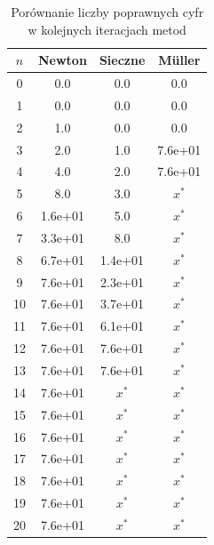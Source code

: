 \documentclass[12pt]{article}
\begin{document}
\begin{table}[H]
\centering
\begin{tabular}{|c|c|c|c|}
    \hline
    $n$ & Newton & Sieczne & Müller  \\ \hline\hline
    0  & 0.0     & 0.0     & 0.0     \\ \hline
    1  & 0.0     & 0.0     & 0.0     \\ \hline
    2  & 1.0     & 0.0     & 0.0     \\ \hline
    3  & 2.0     & 1.0     & 7.6e+01 \\ \hline
    4  & 4.0     & 2.0     & 7.6e+01 \\ \hline
    5  & 8.0     & 3.0     & $x^*$\\ \hline
    6  & 1.6e+01 & 5.0     & $x^*$\\ \hline
    7  & 3.3e+01 & 8.0     & $x^*$\\ \hline
    8  & 6.7e+01 & 1.4e+01 & $x^*$\\ \hline
    9  & 7.6e+01 & 2.3e+01 & $x^*$\\ \hline
    10 & 7.6e+01 & 3.7e+01 & $x^*$\\ \hline
    11 & 7.6e+01 & 6.1e+01 & $x^*$\\ \hline
    12 & 7.6e+01 & 7.6e+01 & $x^*$\\ \hline
    13 & 7.6e+01 & 7.6e+01 & $x^*$\\ \hline
    14 & 7.6e+01 & $x^*$   & $x^*$\\ \hline
    15 & 7.6e+01 & $x^*$   & $x^*$\\ \hline
    16 & 7.6e+01 & $x^*$   & $x^*$\\ \hline
    17 & 7.6e+01 & $x^*$   & $x^*$\\ \hline
    18 & 7.6e+01 & $x^*$   & $x^*$\\ \hline
    19 & 7.6e+01 & $x^*$   & $x^*$\\ \hline
    20 & 7.6e+01 & $x^*$   & $x^*$\\ \hline
\end{tabular}
\caption{Porównanie liczby poprawnych cyfr w kolejnych iteracjach metod}
\label{table:table1}
\end{table}
\end{document}
